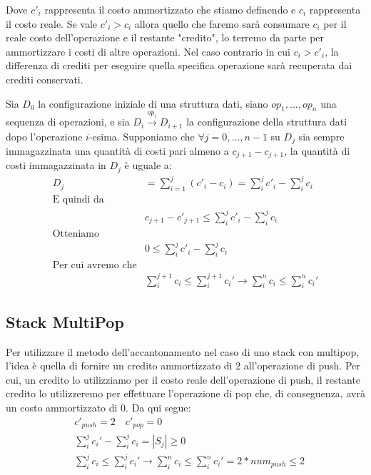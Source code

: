 Dove $c'_i$ rappresenta il costo ammortizzato che stiamo definendo e $c_i$ rappresenta il costo reale. Se vale $c'_i>c_i$ allora quello che faremo sarà consumare $c_i$ per il reale costo dell'operazione e il restante "credito", lo terremo da parte per ammortizzare i costi di altre operazioni. Nel caso contrario in cui $c_i > c'_i$, la differenza di crediti per eseguire quella specifica operazione sarà recuperata dai crediti conservati. 

Sia $D_0$ la configurazione iniziale di una struttura dati, siano $op_1, ..., op_n$ una sequenza di operazioni, e sia $D_i \xrightarrow{op_i}D_{i+1}$ la configurazione della struttura dati dopo l'operazione $i$-esima. Supponiamo che $\forall j = 0,...,n-1$ su $D_j$ sia sempre immagazzinata una quantità di costi pari almeno a $c_{j+1}-c_{j+1}$, la quantità di costi immagazzinata in $D_j$ è uguale a: 
\begin{align*}
D_j
    &=\sum_{i=1}^j (c'_i-c_i) = \sum_i^jc'_i-\sum_i^jc_i \\
    \text{E quindi da}\\
    &c_{j+1}-c'_{j+1} \leq \sum_i^jc'_i-\sum_i^jc_i\\
    \text{Otteniamo}\\
    &0 \leq \sum_i^jc'_i-\sum_i^jc_i \\
    \text{Per cui avremo che}\\
    &\sum_i^{j+1}c_i\leq \sum_i^{j+1}c_i' \xrightarrow{} \sum_i^{n}c_i\leq \sum_i^{n}c_i' 
\end{align*}

\subsection{Stack MultiPop}
Per utilizzare il metodo dell'accantonamento nel caso di uno stack con multipop, l'idea è quella di fornire un credito ammortizzato di 2 all'operazione di push. Per cui, un credito lo utilizziamo per il costo reale dell'operazione di push, il restante credito lo utilizzeremo per effettuare l'operazione di pop che, di conseguenza, avrà un costo ammortizzato di 0. Da qui segue:
\begin{align*}
    &c'_{push} = 2 \quad c'_{pop}= 0 \\
    &\sum_i^jc_i'-\sum_i^jc_i = |S_j| \geq 0 \\
    &\sum_i^jc_i\leq\sum_i^jc_i' \xrightarrow{} \sum_i^nc_i\leq\sum_i^nc_i' = 2*num_{push}\leq 2
\end{align*}
